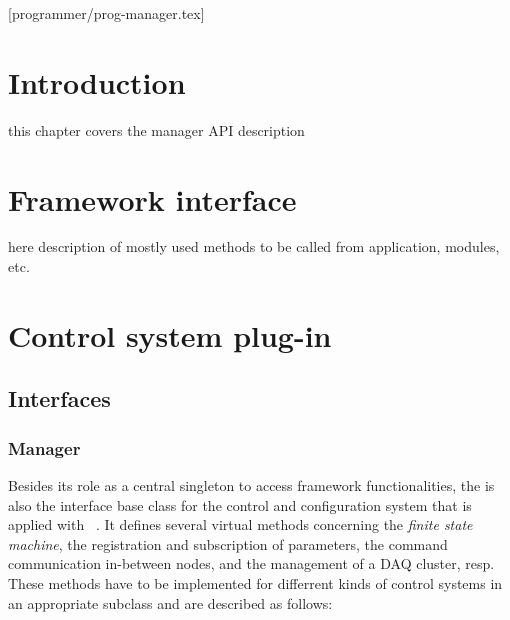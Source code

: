 [programmer/prog-manager.tex]

\section{Introduction}
this chapter covers the manager API description


\section{Framework interface}
here description of mostly used methods to be called from application, modules, etc.


\section{Control system plug-in}

\subsection{Interfaces}


\subsubsection{Manager}
\label{prog_interface_manager}
Besides its role as a central singleton to access framework functionalities,
the  is also the interface base class for the 
control and configuration system that is applied with \dabc~. 
It defines several virtual methods concerning the {\em finite state machine},
the registration and subscription of parameters, the command communication
in-between nodes, and the management of a DAQ cluster, resp.
These methods have to be implemented for differrent kinds of control systems in
an appropriate subclass and are described as follows:

